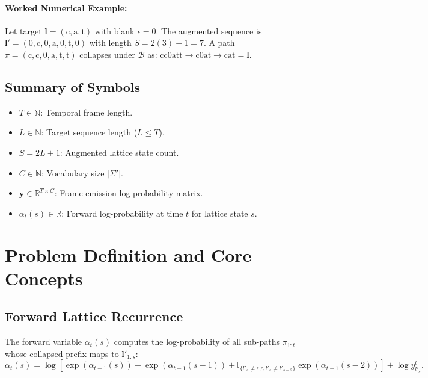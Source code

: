 \documentclass[11pt]{article}
\begin{document}
\paragraph{Worked Numerical Example:}
Let target $\mathbf{l} = (\text{c}, \text{a}, \text{t})$ with blank $\epsilon = 0$.
The augmented sequence is $\mathbf{l}' = (0, \text{c}, 0, \text{a}, 0, \text{t}, 0)$ with length $S = 2(3) + 1 = 7$.
A path $\pi = (\text{c}, \text{c}, 0, \text{a}, \text{t}, \text{t})$ collapses under $\mathcal{B}$ as:
$\text{c} \text{c} 0 \text{a} \text{t} \text{t} \to \text{c} 0 \text{a} \text{t} \to \text{c} \text{a} \text{t} = \mathbf{l}$.

\subsection{Summary of Symbols}
\begin{itemize}
    \item $T \in \mathbb{N}$: Temporal frame length.
    \item $L \in \mathbb{N}$: Target sequence length ($L \le T$).
    \item $S = 2L + 1$: Augmented lattice state count.
    \item $C \in \mathbb{N}$: Vocabulary size $|\Sigma'|$.
    \item $\mathbf{y} \in \mathbb{R}^{T \times C}$: Frame emission log-probability matrix.
    \item $\alpha_t(s) \in \mathbb{R}$: Forward log-probability at time $t$ for lattice state $s$.
\end{itemize}

\section{Problem Definition and Core Concepts}
\label{sec:problem_definition}

\subsection{Forward Lattice Recurrence}
The forward variable $\alpha_t(s)$ computes the log-probability of all sub-paths $\pi_{1:t}$ whose collapsed prefix maps to $\mathbf{l}'_{1:s}$:
\begin{equation}
\label{eq:ctc_alpha_recurrence}
\alpha_t(s) = \log\left[ \exp(\alpha_{t-1}(s)) + \exp(\alpha_{t-1}(s-1)) + \mathbb{I}_{\{l'_s \neq \epsilon \land l'_s \neq l'_{s-2}\}} \exp(\alpha_{t-1}(s-2)) \right] + \log y_{l'_s}^t.
\end{equation}
\end{document}
